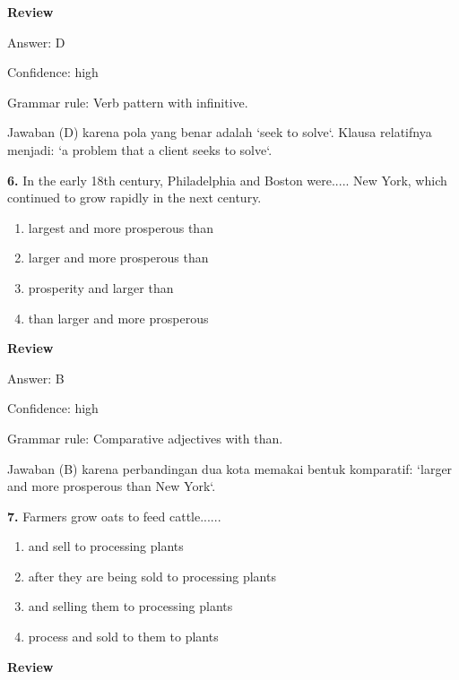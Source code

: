 \documentclass[12pt]{article}
\begin{document}
\par
\begingroup
\setlength{\parskip}{0pt}
\setlength{\parindent}{0pt}
\textbf{Review}\par
Answer: D\par
Confidence: high\par
Grammar rule: Verb pattern with infinitive.\par
Jawaban (D) karena pola yang benar adalah `seek to solve`. Klausa relatifnya menjadi: `a problem that a client seeks to solve`.\par
\endgroup
\par
\vspace{0.25\baselineskip}
\noindent\textbf{6.} In the early 18th century, Philadelphia and Boston were..... New York, which continued to grow rapidly in the next century.
\begin{enumerate}[label=(\Alph*),leftmargin=*,itemsep=0.2em]
\item largest and more prosperous than
\item larger and more prosperous than
\item prosperity and larger than
\item than larger and more prosperous
\end{enumerate}
\par
\begingroup
\setlength{\parskip}{0pt}
\setlength{\parindent}{0pt}
\textbf{Review}\par
Answer: B\par
Confidence: high\par
Grammar rule: Comparative adjectives with than.\par
Jawaban (B) karena perbandingan dua kota memakai bentuk komparatif: `larger and more prosperous than New York`.\par
\endgroup
\par
\vspace{0.25\baselineskip}
\noindent\textbf{7.} Farmers grow oats to feed cattle......
\begin{enumerate}[label=(\Alph*),leftmargin=*,itemsep=0.2em]
\item and sell to processing plants
\item after they are being sold to processing plants
\item and selling them to processing plants
\item process and sold to them to plants
\end{enumerate}
\par
\begingroup
\setlength{\parskip}{0pt}
\setlength{\parindent}{0pt}
\textbf{Review}\par
\end{document}
